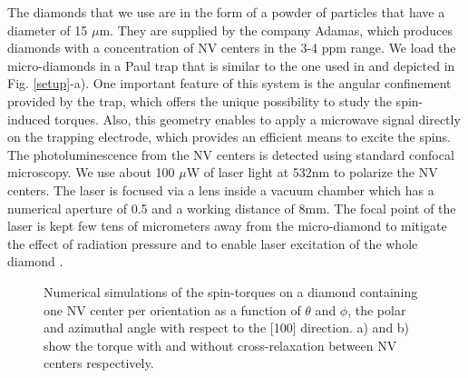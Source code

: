 \documentclass[preprintnumbers,amsmath,amssymb,superscriptaddress,twocolumn,showpacs]{revtex4-1}
\begin{document}
The diamonds that we use are in the form of a powder of particles that have a diameter of 15 $\mu$m. They are supplied by the company Adamas, which produces diamonds with a concentration of NV centers in the 3-4 ppm range. %
We load the micro-diamonds in a Paul trap that is similar to the one used in \cite{delordPRL} and depicted in Fig. \ref{setup}-a). One important feature of this system is the angular confinement provided by the trap, which offers the unique possibility to study the spin-induced torques.
Also, this geometry enables to apply a microwave signal directly on the trapping electrode, which provides an efficient means to excite the spins.
The photoluminescence from the NV centers is detected using standard confocal microscopy. We use about 100 $\mu$W of laser light at 532nm to polarize the NV centers. The laser is focused via a lens inside a vacuum chamber which has a numerical aperture of 0.5 and a working distance of 8mm. The focal point of the laser is kept few tens of micrometers away from the micro-diamond to mitigate the effect of radiation pressure and to enable laser excitation of the whole diamond \cite{delordPRL,delord2016}. 

\begin{figure}[!ht]
  \centering {}
  \caption{Numerical simulations of the spin-torques on a diamond containing one NV center per orientation as a function of $\theta$ and $\phi$, the polar and azimuthal angle with respect to the [100] direction. a) and b) show the torque with and without cross-relaxation between NV centers respectively.}
  \label{Numerics}
\end{figure}
\end{document}
